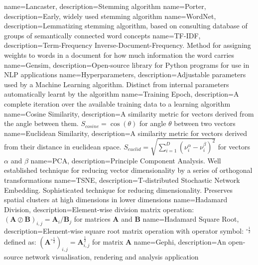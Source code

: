 {
name={Lancaster},
description={Stemming algorithm \cite{lancaster}} 
}
{
name={Porter},
description={Early, widely used stemming algorithm \cite{porter}} 
}
{
name={WordNet},
description={Lemmatizing stemming algorithm, based on consulting database of groups of semantically connected word concepts \cite{wordnet1}\cite{wordnet2}\cite{wordnet3}} 
}
{
name={TF-IDF},
description={Term-Frequency Inverse-Document-Frequency. Method for assigning weights to words in a document for how much information the word carries} 
}
{
name={Gensim},
description={Open-source library for Python programs for use in NLP applications} 
}
{
name={Hyperparameters},
description={Adjustable parameters used by a Machine Learning algorithm. Distinct from internal parameters automatically learnt by the algorithm} 
}
{
name={Training Epoch},
description={A complete iteration over the available training data to a learning algorithm} 
}
{
name={Cosine Similarity},
description={A similarity metric for vectors derived from the angle between them. $S_{cosine}=\cos\left(\theta\right)$ for angle $\theta$ between two vectors} 
}
{
name={Euclidean Similarity},
description={A similarity metric for vectors derived from their distance in euclidean space. $S_{euclid} = \sqrt{\sum_{i=1}^{D}(\nu_i^{\alpha}-\nu_i^{\beta})^{2}}$ for vectors $\alpha$ and $\beta$}
}
{
name={PCA},
description={Principle Component Analysis. Well established technique for reducing vector dimensionality by a series of orthogonal transformations \cite{PCA}} 
}
{
name={TSNE},
description={T-distributed Stochastic Network Embedding. Sophisticated technique for reducing dimensionality. Preserves spatial clusters at high dimensions in lower dimensions \cite{tsne1}} 
}
{
name={Hadamard Division},
description={Element-wise division matrix operation: $\left( \mathbf{A} \oslash \mathbf{B} \right)_{i , j} = \mathbf{A}_i / \mathbf{B}_j  $ for matrices $\mathbf{A}$ and $\mathbf{B}$} 
}
{
name={Hadamard Square Root},
description={Element-wise square root matrix operation with operator symbol: $^{\circ\frac{1}{2}}$ defined as: $\left(\mathbf{A}^{\circ\frac{1}{2}}\right)_{i , j}=\mathbf{A}_{i , j}^{\frac{1}{2}} $ for matrix $\mathbf{A}$} 
}
{
name={Gephi},
description={An open-source network visualisation, rendering and analysis application} 
}
